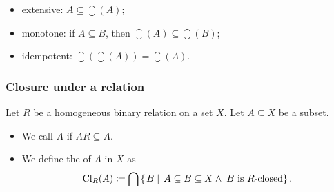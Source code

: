 \begin{definition}
\begin{itemize}
\item extensive: $A \subseteq \closure(A)$;
\item monotone: if $A \subseteq B$, then $\closure(A) \subseteq \closure(B)$;
\item idempotent: $\closure(\closure(A)) = \closure(A)$.
\end{itemize}
\end{definition}

\subsubsection{Closure under a relation}
\begin{definition}
Let $R$ be a homogeneous binary relation on a set $X$. Let $A\subseteq X$ be a subset.
\begin{itemize}
\item We call $A$  if $AR \subseteq A$.
\item We define the  of $A$ in $X$ as
\[ \operatorname{Cl}_R(A) \coloneqq \bigcap \left\{\left. B \;\right|\; A \subseteq B \subseteq X \land \;\text{$B$ is $R$-closed} \right\}. \]
\end{itemize}
\end{definition}

